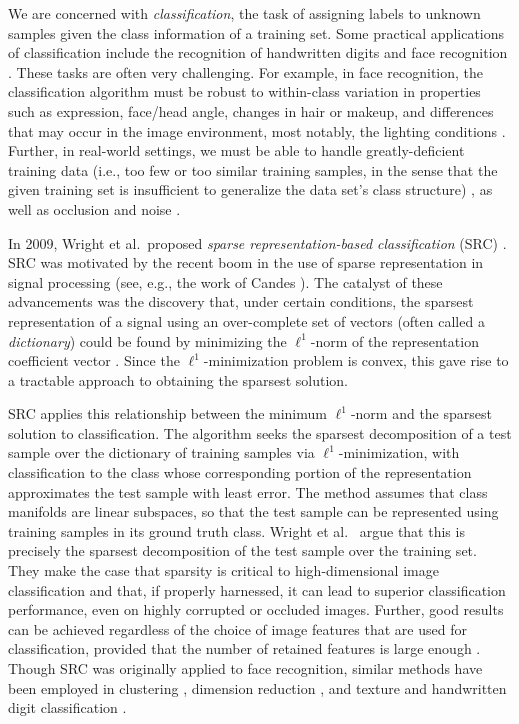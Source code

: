 \documentclass[review]{elsarticle}
\begin{document}
We are concerned with \emph{classification}, the task of assigning labels to unknown samples given the class information of a training set. Some practical applications of classification include the recognition of handwritten digits \cite{lecun:mnist} and face recognition \cite{wri:src,cev:fr,sur:fr}. These tasks are often very challenging. For example, in face recognition, the classification algorithm must be robust to within-class variation in properties such as expression, face/head angle, changes in hair or makeup, and differences that may occur in the image environment, most notably, the lighting conditions \cite{sur:fr}. Further, in real-world settings, we must be able to handle greatly-deficient training data (i.e., too few or too similar training samples, in the sense that the given training set is insufficient to generalize the data set's class structure) \cite{ssfr:sur}, as well as occlusion and noise \cite{wri:src}. 

In 2009, Wright et al.\ proposed \emph{sparse representation-based classification} (SRC) \cite{wri:src}. SRC was motivated by the recent boom in the use of sparse representation in signal processing (see, e.g., the work of Candes \cite{can:spa}). The catalyst of these advancements was the discovery that, under certain conditions, the sparsest representation of a signal using an over-complete set of vectors (often called a \emph{dictionary}) could be found by minimizing the $\ell^1$-norm of the representation coefficient vector \cite{don:und}. Since the $\ell^1$-minimization problem is convex, this gave rise to a tractable approach to obtaining the sparsest solution. 

SRC applies this relationship between the minimum $\ell^1$-norm and the sparsest solution to classification. The algorithm seeks the sparsest decomposition of a test sample over the dictionary of training samples via $\ell^1$-minimization, with classification to the class whose corresponding portion of the representation approximates the test sample with least error. The method assumes that class manifolds are linear subspaces, so that the test sample can be represented using training samples in its ground truth class. Wright et al.\ \cite{wri:src} argue that this is precisely the sparsest decomposition of the test sample over the training set. They make the case that sparsity is critical to high-dimensional image classification and that, if properly harnessed, it can lead to superior classification performance, even on highly corrupted or occluded images. Further, good results can be achieved regardless of the choice of image features that are used for classification, provided that the number of retained features is large enough \cite{wri:src}. Though SRC was originally applied to face recognition, similar methods have been employed in clustering \cite{elh:ssc}, dimension reduction \cite{qiao:spp}, and texture and handwritten digit classification \cite{yan:sria}. 
\end{document}
